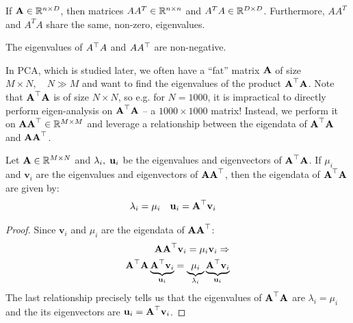 \documentclass[a4paper]{article}
\begin{document}
\begin{lemma} If $\textbf{A} \in \mathbb{R}^{n\times D}$, then matrices $AA^{T} \in \mathbb{R}^{n\times n}$ and  $A^{T}A \in \mathbb{R}^{D\times D}$. Furthermore, $AA^{T}$ and $A^{T}A$ share the same, non-zero, eigenvalues. 
\end{lemma}
\begin{lemma}
The eigenvalues of $A^{\top} A$ and $AA^{\top}$ are non-negative.
\end{lemma}
In PCA, which is studied later, we often have a ``fat'' matrix $\textbf{A}$ of size $M\times N, \quad N \gg M$ and want to find the eigenvalues of the product $\textbf{A}^{\top}\textbf{A}$. Note that $\textbf{A}^{\top}\textbf{A}$ is of size $N\times N$, so e.g. for $N=1000$, it is impractical to directly perform eigen-analysis on  $\textbf{A}^{\top}\textbf{A}$ -- a $1000\times 1000$ matrix! Instead, we perform it on $\textbf{A}\textbf{A}^{\top}\in \mathbb{R}^{M\times M}$ and leverage a relationship between the eigendata of $\textbf{A}^{\top}\textbf{A}$ and $\textbf{A}\textbf{A}^{\top}$.
\begin{lemma}
\label{lem:eig_ata_aat}
	Let $\textbf{A} \in \mathbb{R}^{M\times N}$ and $\lambda_i, \; \textbf{u}_i$	be the eigenvalues and eigenvectors of $\textbf{A}^{\top}\textbf{A}$. If $\mu_i$ and $\textbf{v}_i$ are the eigenvalues and eigenvectors of $\textbf{A}\textbf{A}^{\top}$, then the eigendata of $\textbf{A}^{\top}\textbf{A}$ are given by:
	\begin{align}
		\lambda_i = \mu_i & & & \textbf{u}_i = \textbf{A}^{\top}\textbf{v}_i
	\end{align}
\end{lemma}
\begin{proof}
	Since $\textbf{v}_i$ and $\mu_i$ are the eigendata of $\textbf{A}\textbf{A}^{\top}$:
	\begin{align*}
		\textbf{A}\textbf{A}^{\top}\textbf{v}_i = \mu_i\textbf{v}_i \Rightarrow \\
		\textbf{A}^{\top}\textbf{A}\underbrace{\textbf{A}^{\top}\textbf{v}_i}_{\textbf{u}_i} = \underbrace{\mu_i}_{\lambda_i}\underbrace{\textbf{A}^{\top}\textbf{v}_i}_{\textbf{u}_i}
	\end{align*}
	The last relationship precisely tells us that the eigenvalues of $\textbf{A}^{\top}\textbf{A}$ are $\lambda_i=\mu_i$ and the its eigenvectors are $\textbf{u}_i = \textbf{A}^{\top}\textbf{v}_i$.
\end{proof}
\end{document}
